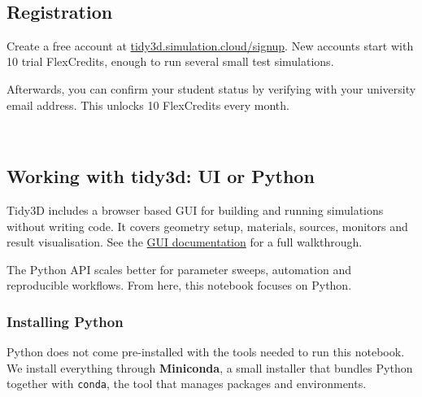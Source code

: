 \documentclass[11pt]{article}
\begin{document}
    \begin{center}
    \end{center}
    { \hspace*{\fill} \\}
    
    \subsection{Registration}\label{registration}

Create a free account at
\href{https://tidy3d.simulation.cloud/signup}{tidy3d.simulation.cloud/signup}.
New accounts start with 10 trial FlexCredits, enough to run several
small test simulations.

Afterwards, you can confirm your student status by verifying with your
university email address. This unlocks 10 FlexCredits every month.

    \begin{center}
    \end{center}
    { \hspace*{\fill} \\}
    
    \subsection{Working with tidy3d: UI or
Python}\label{working-with-tidy3d-ui-or-python}

Tidy3D includes a browser based GUI for building and running simulations
without writing code. It covers geometry setup, materials, sources,
monitors and result visualisation. See the
\href{https://www.flexcompute.com/tidy3d/learning-center/tidy3d-gui/}{GUI
documentation} for a full walkthrough.

The Python API scales better for parameter sweeps, automation and
reproducible workflows. From here, this notebook focuses on Python.

    \subsubsection{Installing Python}\label{installing-python}

Python does not come pre-installed with the tools needed to run this
notebook. We install everything through \textbf{Miniconda}, a small
installer that bundles Python together with \texttt{conda}, the tool
that manages packages and environments.
\end{document}
